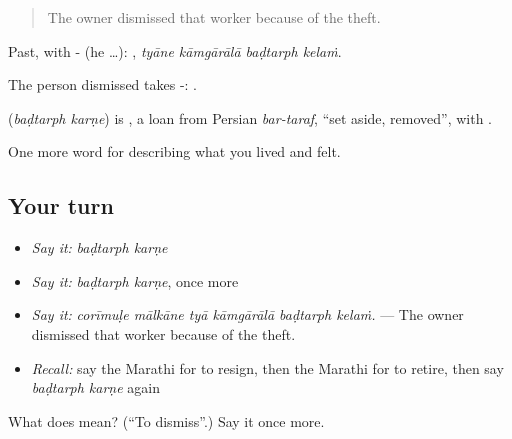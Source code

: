 \begin{quote}
The owner dismissed that worker because of the theft.
\end{quote}

Past, with - (he …):    , \emph{tyāne kāmgārālā baḍtarph kelaṁ}.

The person dismissed takes -:   .

\begin{cousinweb}
\textbf{ } (\emph{baḍtarph karṇe}) is , a loan from Persian \emph{bar-taraf}, \textquotedblleft{}set aside, removed\textquotedblright{}, with .
\end{cousinweb}

\begin{grammarlens}[title={What you've built}]
One more word for describing what you lived and felt.
\end{grammarlens}

\subsection*{Your turn}
\begin{itemize}
\raggedright
  \item \emph{Say it:} \emph{baḍtarph karṇe}
  \item \emph{Say it:} \emph{baḍtarph karṇe}, once more
  \item \emph{Say it:} \emph{corīmuḷe mālkāne tyā kāmgārālā baḍtarph kelaṁ.} — The owner dismissed that worker because of the theft.
  \item \emph{Recall:} say the Marathi for to resign, then the Marathi for to retire, then say \emph{baḍtarph karṇe} again
\end{itemize}

\begin{tcolorbox}[breakable,colback=teal!4,colframe=teal!35!black,title={Before you move on}]
What does   mean? (\textquotedblleft{}To dismiss\textquotedblright{}.) Say it once more.
\end{tcolorbox}
